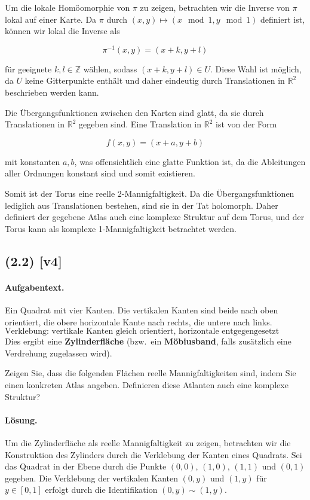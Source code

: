 \documentclass[11pt,a4paper]{article}
\begin{document}
Um die lokale Homöomorphie von \(\pi\) zu zeigen, betrachten wir die Inverse von \(\pi\) lokal auf einer Karte. Da \(\pi\) durch \((x,y) \mapsto (x \mod 1, y \mod 1)\) definiert ist, können wir lokal die Inverse als

\[
\pi^{-1}(x,y) = (x+k, y+l)
\]

für geeignete \(k, l \in \mathbb{Z}\) wählen, sodass \((x+k, y+l) \in U\). Diese Wahl ist möglich, da \(U\) keine Gitterpunkte enthält und daher eindeutig durch Translationen in \(\mathbb{R}^2\) beschrieben werden kann.

Die Übergangsfunktionen zwischen den Karten sind glatt, da sie durch Translationen in \(\mathbb{R}^2\) gegeben sind. Eine Translation in \(\mathbb{R}^2\) ist von der Form

\[
f(x,y) = (x+a, y+b)
\]

mit konstanten \(a, b\), was offensichtlich eine glatte Funktion ist, da die Ableitungen aller Ordnungen konstant sind und somit existieren.

Somit ist der Torus eine reelle 2-Mannigfaltigkeit. Da die Übergangsfunktionen lediglich aus Translationen bestehen, sind sie in der Tat holomorph. Daher definiert der gegebene Atlas auch eine komplexe Struktur auf dem Torus, und der Torus kann als komplexe 1-Mannigfaltigkeit betrachtet werden.


\subsection*{(2.2) [v4]}
\paragraph{Aufgabentext.}
Ein Quadrat mit vier Kanten. 
Die vertikalen Kanten sind beide nach oben orientiert, 
die obere horizontale Kante nach rechts, 
die untere nach links.  
\[
\text{Verklebung: vertikale Kanten gleich orientiert, horizontale entgegengesetzt orientiert.}
\]
Dies ergibt eine \textbf{Zylinderfläche} 
(bzw.\ ein \textbf{Möbiusband}, falls zusätzlich eine Verdrehung zugelassen wird).

Zeigen Sie, dass die folgenden Flächen reelle Mannigfaltigkeiten sind, indem Sie einen konkreten Atlas angeben. Definieren diese Atlanten auch eine komplexe Struktur?

\paragraph{Lösung.}
Um die Zylinderfläche als reelle Mannigfaltigkeit zu zeigen, betrachten wir die Konstruktion des Zylinders durch die Verklebung der Kanten eines Quadrats. Sei das Quadrat in der Ebene durch die Punkte \((0,0)\), \((1,0)\), \((1,1)\) und \((0,1)\) gegeben. Die Verklebung der vertikalen Kanten \((0,y)\) und \((1,y)\) für \(y \in [0,1]\) erfolgt durch die Identifikation \((0,y) \sim (1,y)\).
\end{document}

